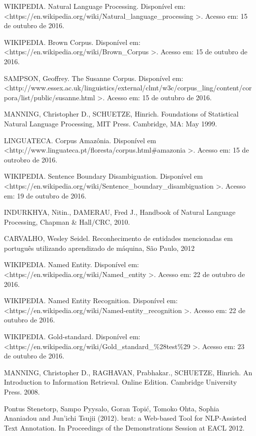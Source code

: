 \documentclass[11pt]{report}
\begin{document}
\begin{enumerate}[label={[\arabic*]}]
\item WIKIPEDIA. Natural Language Processing. Disponível em: \newline\textless\enspace https://en.wikipedia.org/wiki/Natural\_language\_processing \enspace\textgreater. Acesso em: 15 de outubro de 2016.
\item WIKIPEDIA. Brown Corpus. Disponível em: \textless\enspace https://en.wikipedia.org/wiki/Brown\_Corpus \enspace\textgreater. Acesso em: 15 de outubro de 2016.
\item SAMPSON, Geoffrey. The Susanne Corpus. Disponível em: \newline\textless\enspace http://www.essex.ac.uk/linguistics/external/clmt/w3c/corpus\_ling/content/\newline corpora/list/public/susanne.html \enspace\textgreater. Acesso em: 15 de outubro de 2016.
\item MANNING, Christopher D., SCHUETZE, Hinrich. Foundations of Statistical Natural Language Processing, MIT Press. Cambridge, MA: May 1999.
\item LINGUATECA. Corpus Amazônia. Disponível em \textless\enspace http://www.linguateca.pt/floresta/\newline corpus.html\#amazonia \enspace\textgreater. Acesso em: 15 de outrobro de 2016.
\item WIKIPEDIA. Sentence Boundary Disambiguation. Disponível em \newline\textless\enspace https://en.wikipedia.org/wiki/Sentence\_boundary\_disambiguation \enspace\textgreater. Acesso em: 19 de outubro de 2016.
\item INDURKHYA, Nitin., DAMERAU, Fred J., Handbook of Natural Language Processing, Chapman \& Hall/CRC, 2010.
\item CARVALHO, Wesley Seidel. Reconhecimento de entidades mencionadas em português utilizando aprendizado de máquina, São Paulo, 2012
\item WIKIPEDIA. Named Entity. Disponível em: \newline\textless\enspace https://en.wikipedia.org/wiki/Named\_entity \enspace\textgreater. Acesso em: 22 de outubro de 2016.
\item WIKIPEDIA. Named Entity Recognition. Disponível em: \newline\textless\enspace https://en.wikipedia.org/wiki/Named-entity\_recognition \enspace\textgreater. Acesso em: 22 de outubro de 2016.
\item WIKIPEDIA. Gold-standard. Disponível em: \newline\textless\enspace https://en.wikipedia.org/wiki/Gold\_standard\_\%28test\%29 \enspace\textgreater. Acesso em: 23 de outubro de 2016.
\item MANNING, Christopher D., RAGHAVAN, Prabhakar., SCHUETZE, Hinrich. An Introduction to Information Retrieval. Online Edition. Cambridge University Press. 2008.
\item Pontus Stenetorp, Sampo Pyysalo, Goran Topić, Tomoko Ohta, Sophia Ananiadou and Jun'ichi Tsujii (2012). brat: a Web-based Tool for NLP-Assisted Text Annotation. In Proceedings of the Demonstrations Session at EACL 2012.
\end{enumerate}
\end{document}
